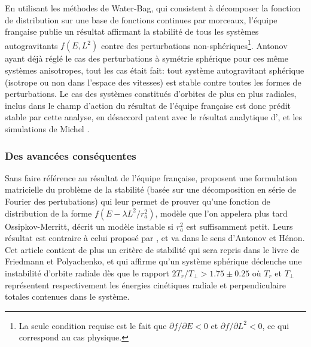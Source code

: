 En utilisant les méthodes de Water-Bag, qui consistent à décomposer la fonction de distribution sur une base de fonctions continues par morceaux,
l'équipe française \cite{waterbag} publie un résultat affirmant la stabilité de tous les systèmes autogravitants $f\left(  E,L^{2}\right)  $ contre
des perturbations non-sphériques\footnote{La seule condition requise est le fait que $\partial f/\partial E<0$ et $\partial f/\partial L^{2}<0$, ce
qui correspond au cas physique.}. Antonov ayant déjà réglé le cas des perturbations à symétrie sphérique pour ces même systèmes anisotropes, tout les
cas était fait: tout système autogravitant sphérique (isotrope ou non dans l'espace des vitesses) est stable contre toutes les formes de
perturbations. Le cas des systèmes constitués d'orbites de plus en plus radiales, inclus dans le champ d'action du résultat de l'équipe française est
donc prédit stable par cette analyse, en désaccord patent avec le résultat analytique d'\cite{antonov}, et les simulations de Michel \cite{henon}.

\subsubsection{Des avancées conséquentes\label{roiadvances}}

Sans faire référence au résultat de l'équipe française, proposent une formulation matricielle du problème de
la stabilité (basée sur une décomposition en série de Fourier des pertubations) qui leur permet de prouver qu'une fonction de distribution de la forme
$f\left(  E-\lambda L^{2}/r_{a}^{2}\right)$, modèle que l'on appelera plus tard Ossipkov-Merritt, décrit un modèle instable si $r_{a}^{2}$ est
suffisamment petit. Leurs résultat est contraire à celui proposé par \cite{waterbag}, et va dans
le sens d'Antonov et Hénon. Cet article contient de plus un critère de stabilité qui sera repris dans le livre de Friedmann et Polyachenko, et qui
affirme qu'un système sphérique déclenche une instabilité d'orbite radiale dès que le rapport $2T_{r}/T_{\perp}>1.75\pm0.25$ o\`{u} $T_{r}$ et
$T_{\perp}$ représentent respectivement les énergies cinétiques radiale et perpendiculaire totales contenues dans le système.

